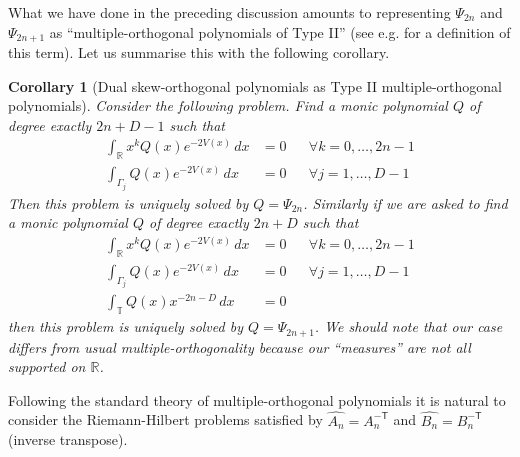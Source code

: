 \documentclass[12pt]{article}
\newtheorem{corollary}[theorem]{Corollary}
\theoremstyle{definition}
\begin{document}
What we have done in the preceding discussion amounts to representing $\Psi_{2n}$ and $\Psi_{2n+1}$ as \enquote{multiple-orthogonal polynomials of Type II} (see e.g. \cite{Martinez_Finkelshtein_2016} for a definition of this term). Let us summarise this with the following corollary.
\begin{corollary}[Dual skew-orthogonal polynomials as Type II multiple-orthogonal polynomials]\label{typeII} Consider the following problem. Find a monic polynomial $Q$ of degree exactly $2n+D-1$ such that
\begin{align*}
\int_\mathbb{R} x^k Q(x) e^{-2V(x)}\, dx &= 0 & & \forall k = 0, \dots, 2n-1 \\
\int_{\Gamma_j} Q(x) e^{-2V(x)}\, dx &= 0 & & \forall j=1,\dots, D-1
\end{align*}
Then this problem is uniquely solved by $Q = \Psi_{2n}$. Similarly if we are asked to find a monic polynomial $Q$ of degree exactly $2n+D$ such that
\begin{align*}
\int_\mathbb{R} x^k Q(x) e^{-2V(x)}\, dx &= 0 & & \forall k = 0, \dots, 2n-1 \\
\int_{\Gamma_j} Q(x) e^{-2V(x)}\, dx &= 0 & & \forall j=1,\dots, D-1 \\
\int_{\mathbb{T}} Q(x) x^{-2n-D} \, dx &= 0
\end{align*}
then this problem is uniquely solved by $Q = \Psi_{2n+1}$. We should note that our case differs from usual multiple-orthogonality because our \enquote{measures} are not all supported on $\mathbb{R}$.
\end{corollary}
Following the standard theory of multiple-orthogonal polynomials \cite{VanAssche2001} it is natural to consider the Riemann-Hilbert problems satisfied by $\widehat{A_n} = A_n^{- \mathsf{T}}$ and $\widehat{B_n} = B_n^{- \mathsf{T}}$ (inverse transpose). 
\end{document}
